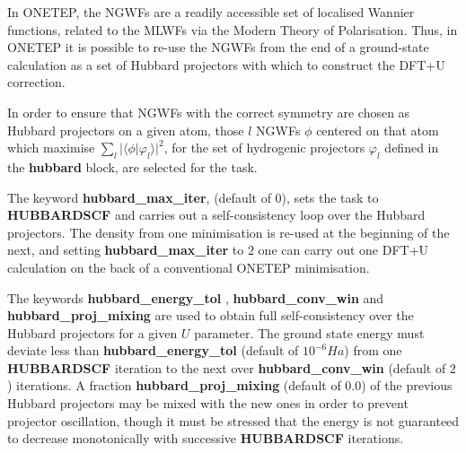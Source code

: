 \documentclass[a4paper,oneside,11pt]{article}
\numberwithin{equation}{section}
\begin{document}
In ONETEP, the NGWFs are a readily accessible set of localised Wannier functions, related to the 
MLWFs via the Modern Theory of Polarisation. Thus, in ONETEP it is possible to re-use the NGWFs from
the end of a ground-state calculation as a set of Hubbard projectors with which to construct the DFT+U correction. 

In order to ensure that NGWFs with the correct symmetry are chosen as Hubbard projectors on a given
atom, those $l$ NGWFs $\phi$ centered on that atom which maximise $\sum_l \lvert \langle \phi \rvert \varphi_l\rangle \rvert^2$,
for the set of hydrogenic projectors $\varphi_l$ defined in the \textbf{hubbard} block, are selected for the task.

The keyword \textbf{hubbard\_max\_iter}, (default of $0$), sets the task to \textbf{HUBBARDSCF}
and carries out a self-consistency loop over the Hubbard projectors. The density from one minimisation is re-used at the beginning of the next,
and setting \textbf{hubbard\_max\_iter} to $2$ one can carry out one DFT+U calculation on the back of 
a conventional ONETEP minimisation. 

The keywords \textbf{hubbard\_energy\_tol} , \textbf{hubbard\_conv\_win} and  \textbf{hubbard\_proj\_mixing} are used
to obtain full self-consistency over the Hubbard projectors for a given $U$ parameter. The ground state energy must
deviate less than \textbf{hubbard\_energy\_tol} (default of $10^{-6}Ha$) from one  \textbf{HUBBARDSCF} iteration 
to the next over  \textbf{hubbard\_conv\_win} (default of $2$) iterations. A fraction  \textbf{hubbard\_proj\_mixing} (default of $0.0$) 
of the previous Hubbard projectors may be mixed with the new ones in order to prevent projector oscillation, though
it must be stressed that the energy is not guaranteed to decrease monotonically with successive \textbf{HUBBARDSCF} iterations.
\end{document}
